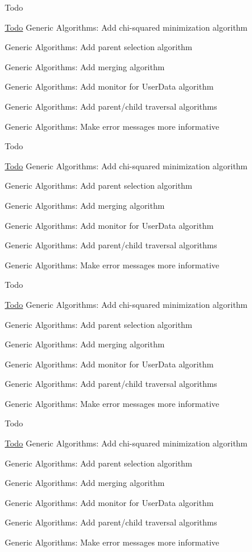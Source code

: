 \begin{DoxyRefDesc}{Todo}
\item[\hyperlink{todo__todo000005}{Todo}]Generic Algorithms\+: Add chi-\/squared minimization algorithm 

Generic Algorithms\+: Add parent selection algorithm 

Generic Algorithms\+: Add merging algorithm 

Generic Algorithms\+: Add monitor for User\+Data algorithm 

Generic Algorithms\+: Add parent/child traversal algorithms 

Generic Algorithms\+: Make error messages more informative \end{DoxyRefDesc}


\begin{DoxyRefDesc}{Todo}
\item[\hyperlink{todo__todo000006}{Todo}]Generic Algorithms\+: Add chi-\/squared minimization algorithm 

Generic Algorithms\+: Add parent selection algorithm 

Generic Algorithms\+: Add merging algorithm 

Generic Algorithms\+: Add monitor for User\+Data algorithm 

Generic Algorithms\+: Add parent/child traversal algorithms 

Generic Algorithms\+: Make error messages more informative \end{DoxyRefDesc}


\begin{DoxyRefDesc}{Todo}
\item[\hyperlink{todo__todo000007}{Todo}]Generic Algorithms\+: Add chi-\/squared minimization algorithm 

Generic Algorithms\+: Add parent selection algorithm 

Generic Algorithms\+: Add merging algorithm 

Generic Algorithms\+: Add monitor for User\+Data algorithm 

Generic Algorithms\+: Add parent/child traversal algorithms 

Generic Algorithms\+: Make error messages more informative \end{DoxyRefDesc}


\begin{DoxyRefDesc}{Todo}
\item[\hyperlink{todo__todo000008}{Todo}]Generic Algorithms\+: Add chi-\/squared minimization algorithm 

Generic Algorithms\+: Add parent selection algorithm 

Generic Algorithms\+: Add merging algorithm 

Generic Algorithms\+: Add monitor for User\+Data algorithm 

Generic Algorithms\+: Add parent/child traversal algorithms 

Generic Algorithms\+: Make error messages more informative \end{DoxyRefDesc}


